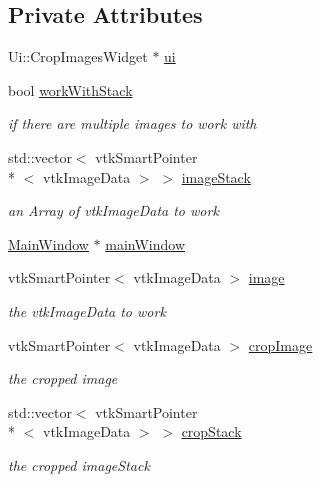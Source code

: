 \subsection*{Private Attributes}
\begin{DoxyCompactItemize}
\item 
Ui\-::\-Crop\-Images\-Widget $\ast$ \hyperlink{class_crop_images_widget_adc7928104c839cc22de3d73b286b1fad}{ui}
\item 
bool \hyperlink{class_crop_images_widget_afaead54d7c3cf3549137e3177db95385}{work\-With\-Stack}
\begin{DoxyCompactList}\small\item\em if there are multiple images to work with \end{DoxyCompactList}\item 
std\-::vector$<$ vtk\-Smart\-Pointer\\*
$<$ vtk\-Image\-Data $>$ $>$ \hyperlink{class_crop_images_widget_a924d245cce06a0c16d6c4bd8a3762a67}{image\-Stack}
\begin{DoxyCompactList}\small\item\em an Array of vtk\-Image\-Data to work \end{DoxyCompactList}\item 
\hyperlink{class_main_window}{Main\-Window} $\ast$ \hyperlink{class_crop_images_widget_a1fa1df3ba49de9524eac0a15875f57d5}{main\-Window}
\item 
vtk\-Smart\-Pointer$<$ vtk\-Image\-Data $>$ \hyperlink{class_crop_images_widget_ab160815d191ed30e0c6b8a905818ab3b}{image}
\begin{DoxyCompactList}\small\item\em the vtk\-Image\-Data to work \end{DoxyCompactList}\item 
vtk\-Smart\-Pointer$<$ vtk\-Image\-Data $>$ \hyperlink{class_crop_images_widget_afafb6d17550677101da809f2d2b795dc}{crop\-Image}
\begin{DoxyCompactList}\small\item\em the cropped image \end{DoxyCompactList}\item 
std\-::vector$<$ vtk\-Smart\-Pointer\\*
$<$ vtk\-Image\-Data $>$ $>$ \hyperlink{class_crop_images_widget_a03f87c8aabe879b16e585dae60d4415b}{crop\-Stack}
\begin{DoxyCompactList}\small\item\em the cropped image\-Stack \end{DoxyCompactList}\end{DoxyCompactItemize}


